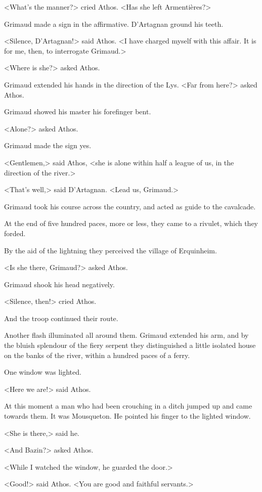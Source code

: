 <What's the manner?> cried Athos. <Has she left Armentières?> 

Grimaud made a sign in the affirmative. D'Artagnan ground his teeth. 

<Silence, D'Artagnan!> said Athos. <I have charged myself with this affair. It is for me, then, to interrogate Grimaud.> 

<Where is she?> asked Athos. 

Grimaud extended his hands in the direction of the Lys. <Far from here?> asked Athos. 

Grimaud showed his master his forefinger bent. 

<Alone?> asked Athos. 

Grimaud made the sign yes. 

<Gentlemen,> said Athos, <she is alone within half a league of us, in the direction of the river.> 

<That's well,> said D'Artagnan. <Lead us, Grimaud.> 

Grimaud took his course across the country, and acted as guide to the cavalcade. 

At the end of five hundred paces, more or less, they came to a rivulet, which they forded. 

By the aid of the lightning they perceived the village of Erquinheim. 

<Is she there, Grimaud?> asked Athos. 

Grimaud shook his head negatively. 

<Silence, then!> cried Athos. 

And the troop continued their route. 

Another flash illuminated all around them. Grimaud extended his arm, and by the bluish splendour of the fiery serpent they distinguished a little isolated house on the banks of the river, within a hundred paces of a ferry. 

One window was lighted. 

<Here we are!> said Athos. 

At this moment a man who had been crouching in a ditch jumped up and came towards them. It was Mousqueton. He pointed his finger to the lighted window. 

<She is there,> said he. 

<And Bazin?> asked Athos. 

<While I watched the window, he guarded the door.> 

<Good!> said Athos. <You are good and faithful servants.> 

